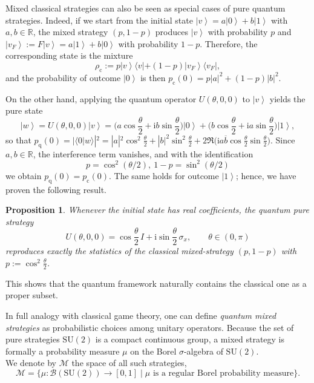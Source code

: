 \documentclass[11pt,a4paper,twoside]{article}
\newcommand{\SU}{\mathrm{SU}}
\newcommand{\mi}{\mathrm{i}} %
\newcommand{\ket}[1]{\left| #1 \right\rangle} %
\newcommand{\bra}[1]{\langle #1 |} %
\newcommand{\braket}[1]{\langle #1 \rangle} %
\newtheorem{proposition}[definition]{Proposition}
\begin{document}
Mixed classical strategies can also be seen as special cases of pure quantum strategies.
Indeed, if we start from the initial state \(\ket{v}=a\ket{0}+b\ket{1}\) with \(a,b\in\mathbb{R}\), the mixed strategy $(p,1-p)$ produces $\ket{v}$ with probability $p$ and $\ket{v_F}:=F\ket{v}=a\ket{1}+b\ket{0}$ with probability $1-p$. Therefore, the corresponding state is the mixture 
$$\rho_{\text{c}}:=p\ket{v}\!\bra{v}+(1-p)\ket{v_F}\!\bra{v_F},$$
and the probability of outcome \(\ket{0}\) is then
\(p_{\text{c}}(0)=p|a|^{2}+(1-p)|b|^{2}\).  

On the other hand, applying the quantum operator \(U(\theta,0,0)\) to $\ket{v}$ yields the pure state  
$$\ket{w}=U(\theta,0,0)\ket{v}=\bigl(a\cos\frac{\theta}{2}+\mi b\sin\frac{\theta}{2}\bigr)\ket{0}
       +\bigl(b\cos\frac{\theta}{2}+\mi a\sin\frac{\theta}{2}\bigr)\ket{1},
$$
so that  
\(p_{\text{q}}(0)=|\braket {0|w}|^{2}
 =|a|^{2}\cos^{2}\frac{\theta}{2}+|b|^{2}\sin^{2}\frac{\theta}{2}
  +2\Re\!\bigl(\mi a\overline{b}\cos\frac{\theta}{2}\sin\frac{\theta}{2}\bigr)\).  
Since \(a,b\in\mathbb{R}\), the interference term vanishes, and with the identification  
$$p=\cos^{2}(\theta/2),\ 1-p=\sin^{2}(\theta/2)$$ we obtain \(p_{\text{q}}(0)=p_{\text{c}}(0)\).  
The same holds for outcome \(\ket{1}\); hence, we have proven the following result.

\begin{proposition}
Whenever the initial state has real coefficients, the quantum pure strategy 
\[
U(\theta,0,0)=\cos\frac\theta2\,I + \mi\sin\frac\theta2\,\sigma_x,\qquad\theta\in(0,\pi)
\]
reproduces exactly the statistics of the classical mixed-strategy $(p,1-p)$ with $p:=\cos^2\frac\theta2$.
\end{proposition}



This shows that the quantum framework naturally contains the classical one as a proper subset.

\medskip


In full analogy with classical game theory, one can define \emph{quantum mixed strategies} as probabilistic choices among unitary operators. 
Because the set of pure strategies \(\SU(2)\) is a compact continuous group, a mixed strategy is formally a probability measure \(\mu\) on the Borel \(\sigma\)-algebra of \(\SU(2)\).  \\
We denote by $\mathcal{M}$ the space of all such strategies,
\begin{equation}\label{def-M}
\mathcal{M} = \bigl\{\mu:\mathcal{B}(\SU(2))\to[0,1] \mid \mu \text{ is a regular Borel probability measure}\bigr\}.
\end{equation}
\end{document}
